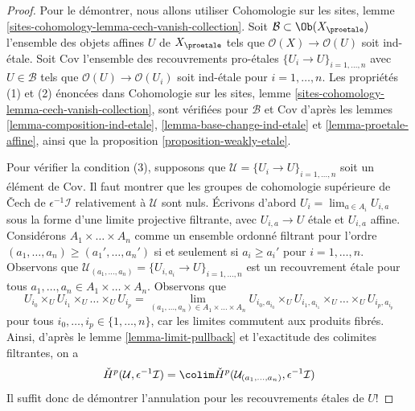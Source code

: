 \begin{proof}
Pour le démontrer, nous allons utiliser
Cohomologie sur les sites, lemme \ref{sites-cohomology-lemma-cech-vanish-collection}.
Soit $\mathcal{B} \subset \Ob(X_\proetale)$ l'ensemble des objets affines
$U$ de $X_\proetale$ tels que $\mathcal{O}(X) \to \mathcal{O}(U)$ soit
ind-\'etale. Soit $\text{Cov}$ l'ensemble des recouvrements pro-\'etales
$\{U_i \to U\}_{i = 1, \ldots, n}$ avec $U \in \mathcal{B}$ tels que
$\mathcal{O}(U) \to \mathcal{O}(U_i)$ soit ind-\'etale pour $i = 1, \ldots, n$.
Les propriétés (1) et (2) énoncées dans
Cohomologie sur les sites, lemme \ref{sites-cohomology-lemma-cech-vanish-collection},
sont vérifiées pour $\mathcal{B}$ et $\text{Cov}$ d'après les
lemmes \ref{lemma-composition-ind-etale},
\ref{lemma-base-change-ind-etale} et
\ref{lemma-proetale-affine}, ainsi que la
proposition \ref{proposition-weakly-etale}.

\medskip\noindent
Pour vérifier la condition (3), supposons que
$\mathcal{U} = \{U_i \to U\}_{i = 1, \ldots, n}$
soit un élément de $\text{Cov}$. Il faut montrer que les groupes de
cohomologie supérieure de Čech de $\epsilon^{-1}\mathcal{I}$
relativement à $\mathcal{U}$ sont nuls.
Écrivons d'abord $U_i = \lim_{a \in A_i} U_{i, a}$ sous la forme d'une limite projective filtrante,
avec $U_{i, a} \to U$ \'etale et $U_{i, a}$ affine.
Considérons $A_1 \times \ldots \times A_n$ comme un ensemble ordonné filtrant
pour l'ordre $(a_1, \ldots, a_n) \geq (a_1', \ldots, a_n')$
si et seulement si $a_i \geq a_i'$ pour $i = 1, \ldots, n$.
Observons que
$\mathcal{U}_{(a_1, \ldots, a_n)} = \{U_{i, a_i} \to U\}_{i = 1, \ldots, n}$
est un recouvrement \'etale pour tous
$a_1, \ldots, a_n \in A_1 \times \ldots \times A_n$.
Observons que
$$
U_{i_0} \times_U U_{i_1} \times_U \ldots \times_U U_{i_p}
=
\lim_{(a_1, \ldots, a_n) \in A_1 \times \ldots \times A_n}
U_{i_0, a_{i_0}} \times_U
U_{i_1, a_{i_1}} \times_U \ldots \times_U U_{i_p, a_{i_p}}
$$
pour tous $i_0, \ldots, i_p \in \{1, \ldots, n\}$, car les limites
commutent aux produits fibrés. Ainsi, d'après le lemme \ref{lemma-limit-pullback}
et l'exactitude des colimites filtrantes, on a
$$
\check{H}^p(\mathcal{U}, \epsilon^{-1}\mathcal{I}) =
\colim \check{H}^p(\mathcal{U}_{(a_1, \ldots, a_n)}, \epsilon^{-1}\mathcal{I}) 
$$
Il suffit donc de démontrer l'annulation pour les recouvrements \'etales
de $U$!


\end{proof}
